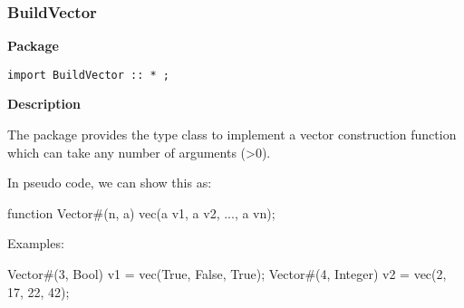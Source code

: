 \subsubsection{BuildVector}
\label{sec-BuildVector}


{\bf Package}

\begin{verbatim}
import BuildVector :: * ;
\end{verbatim}

{\bf Description}

The  package provides the  type class
to implement a vector  construction function which can take
any number of arguments (>0).

In pseudo code, we can show this as:
\begin{libverbatim}
   function Vector#(n, a) vec(a v1, a v2, ..., a vn);
\end{libverbatim}

Examples:

\begin{libverbatim}
   Vector#(3, Bool) v1 = vec(True, False, True);
   Vector#(4, Integer) v2 = vec(2, 17, 22, 42);
\end{libverbatim}




